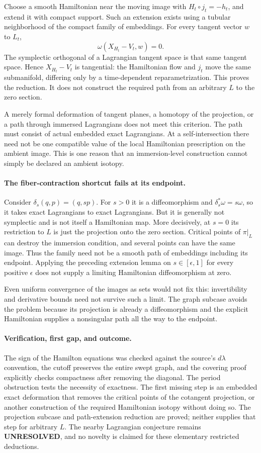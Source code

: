 \documentclass[11pt]{article}
\begin{document}
Choose a smooth Hamiltonian near the moving image with
$H_t\circ j_t=-h_t$, and extend it with compact support. Such an
extension exists using a tubular neighborhood of the compact family
of embeddings. For every tangent vector $w$ to $L_t$,
\[
 \omega(X_{H_t}-V_t,w)=0.
\]
The symplectic orthogonal of a Lagrangian tangent space is that same
tangent space. Hence $X_{H_t}-V_t$ is tangential: the Hamiltonian flow
and $j_t$ move the same submanifold, differing only by a time-dependent
reparametrization. This proves the reduction. It does not construct the
required path from an arbitrary $L$ to the zero section.

A merely formal deformation of tangent planes, a homotopy of the
projection, or a path through immersed Lagrangians does not meet this
criterion. The path must consist of actual embedded exact Lagrangians.
At a self-intersection there need not be one compatible value of the
local Hamiltonian prescription on the ambient image. This is one reason
that an immersion-level construction cannot simply be declared an
ambient isotopy.

\paragraph{The fiber-contraction shortcut fails at its endpoint.}
Consider $\delta_s(q,p)=(q,sp)$. For $s>0$ it is a diffeomorphism and
$\delta_s^*\omega=s\omega$, so it takes exact Lagrangians to exact
Lagrangians. But it is generally not symplectic and is not itself a
Hamiltonian map. More decisively, at $s=0$ its restriction to $L$ is
just the projection onto the zero section. Critical points of
$\pi|_L$ can destroy the immersion condition, and several points can
have the same image. Thus the family need not be a smooth path of
embeddings including its endpoint. Applying the preceding extension
lemma on $s\in[\epsilon,1]$ for every positive $\epsilon$ does not
supply a limiting Hamiltonian diffeomorphism at zero.

Even uniform convergence of the images as sets would not fix this:
invertibility and derivative bounds need not survive such a limit.
The graph subcase avoids the problem because its projection is already
a diffeomorphism and the explicit Hamiltonian supplies a nonsingular
path all the way to the endpoint.

\paragraph{Verification, first gap, and outcome.}
The sign of the Hamilton equations was checked against the source's
$d\lambda$ convention, the cutoff preserves the entire swept graph,
and the covering proof explicitly checks compactness after removing the
diagonal. The period obstruction tests the necessity of exactness.
The first missing step is an embedded exact deformation that removes
the critical points of the cotangent projection, or another construction
of the required Hamiltonian isotopy without doing so. The projection
subcase and path-extension reduction are proved; neither supplies that
step for arbitrary $L$. The nearby Lagrangian conjecture remains
\textbf{UNRESOLVED}, and no novelty is claimed for these elementary
restricted deductions.
\end{document}
